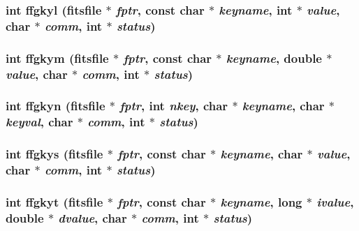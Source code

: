 \subsubsection{\setlength{\rightskip}{0pt plus 5cm}int ffgkyl (\bf{fitsfile} $\ast$ {\em fptr}, const char $\ast$ {\em keyname}, int $\ast$ {\em value}, char $\ast$ {\em comm}, int $\ast$ {\em status})}\label{fitsio__64_8h_514f9731bc6c8ba190dccd5d4744f841}


\subsubsection{\setlength{\rightskip}{0pt plus 5cm}int ffgkym (\bf{fitsfile} $\ast$ {\em fptr}, const char $\ast$ {\em keyname}, double $\ast$ {\em value}, char $\ast$ {\em comm}, int $\ast$ {\em status})}\label{fitsio__64_8h_8e2c807fdca3339d4789efea6f71f64a}


\subsubsection{\setlength{\rightskip}{0pt plus 5cm}int ffgkyn (\bf{fitsfile} $\ast$ {\em fptr}, int {\em nkey}, char $\ast$ {\em keyname}, char $\ast$ {\em keyval}, char $\ast$ {\em comm}, int $\ast$ {\em status})}\label{fitsio__64_8h_767eade3619fc0d0f2642f25121b2f70}


\subsubsection{\setlength{\rightskip}{0pt plus 5cm}int ffgkys (\bf{fitsfile} $\ast$ {\em fptr}, const char $\ast$ {\em keyname}, char $\ast$ {\em value}, char $\ast$ {\em comm}, int $\ast$ {\em status})}\label{fitsio__64_8h_556303d192d9b46c3fa0950d058f6245}


\subsubsection{\setlength{\rightskip}{0pt plus 5cm}int ffgkyt (\bf{fitsfile} $\ast$ {\em fptr}, const char $\ast$ {\em keyname}, long $\ast$ {\em ivalue}, double $\ast$ {\em dvalue}, char $\ast$ {\em comm}, int $\ast$ {\em status})}\label{fitsio__64_8h_dd68662c84062c1a1c4433358adb0e3f}


